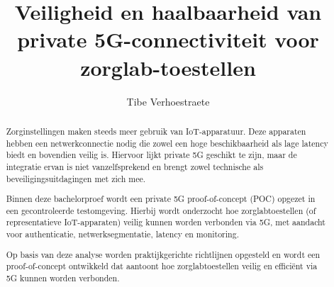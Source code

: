 \documentclass{hogent-article}
\title{Veiligheid en haalbaarheid van private 5G-connectiviteit voor zorglab-toestellen}
\author{Tibe Verhoestraete}
\begin{document}
\sloppy
	\begin{abstract}
		Zorginstellingen maken steeds meer gebruik van IoT-apparatuur. Deze apparaten hebben een netwerkconnectie nodig die zowel een hoge beschikbaarheid als lage latency biedt en bovendien veilig is. Hiervoor lijkt private 5G geschikt te zijn, maar de integratie ervan is niet vanzelfsprekend en brengt zowel technische als beveiligingsuitdagingen met zich mee.
		
		Binnen deze bachelorproef wordt een private 5G proof-of-concept (POC) opgezet in een gecontroleerde testomgeving. Hierbij wordt onderzocht hoe zorglabtoestellen (of representatieve IoT-apparaten) veilig kunnen worden verbonden via 5G, met aandacht voor authenticatie, netwerksegmentatie, latency en monitoring.
		
		Op basis van deze analyse worden praktijkgerichte richtlijnen opgesteld en wordt een proof-of-concept ontwikkeld dat aantoont hoe zorglabtoestellen veilig en efficiënt via 5G kunnen worden verbonden.
	\end{abstract}
	
	\tableofcontents
	
	
	
	\printbibliography[heading=bibintoc]
	
\end{document}
